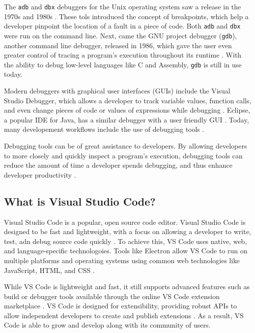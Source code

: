 \documentclass{article}
\begin{document}
The \lstinline{adb} and \lstinline{dbx} debuggers for the Unix operating system saw a release in the 1970s and 1980s \cite{BellLaboratories_1983, Linton_1990}. These tols introduced the concept of breakpoints, which help a developer pinpoint the location of a fault in a piece of code. Both \lstinline{adb} and \lstinline{dbx} were run on the command line. Next, came the GNU project debugger (\lstinline{gdb}), another command line debugger, released in 1986, which gave the user even greater control of tracing a program's execution throughout its runtime \cite{GNU_FSF_2023}. With the ability to debug low-level languages like C and Assembly, \lstinline{gdb} is still in use today.

Modern debuggers with graphical user interfaces (GUIs) include the Visual Studio Debugger, which allows a developer to track variable values, function calls, and even change pieces of code or values of expressions while debugging \cite{Microsoft_2022b}. Eclipse, a popular IDE for Java, has a similar debugger with a user friendly GUI \cite{Sinha_2017}. Today, many developement workflows include the use of debugging tools \cite{Matloff_Salzman_2008}.

Debugging tools can be of great assistance to developers. By allowing developers to more closely and quickly inspect a program's execution, debugging tools can reduce the amount of time a developer spends debugging, and thus enhance developer productivity \cite{ZhRaAmRuWo_2008}. 

\subsection{What is Visual Studio Code?}

Visual Studio Code is a popular, open source code editor. Visual Studio Code is designed to be fast and lightweight, with a focus on allowing a developer to write, test, adn debug source code quickly \cite{Microsoft_2023c}. To achieve this, VS Code uses native, web, and language-specific technologoies. Tools like Electron allow VS Code to run on multiple platforms and operating systems using common web technologies like JavaScript, HTML, and CSS \cite{Electron_2023}.

While VS Code is lightweight and fast, it still supports advanced features such as build or debugger tools available through the online VS Code extension marketplace \cite{Microsoft_2023b}. VS Code is designed for extensibility, providing robust APIs to allow independent developers to create and publish extensions \cite{Microsoft_2023d}. As a result, VS Code is able to grow and develop along with its community of users. 
\end{document}
